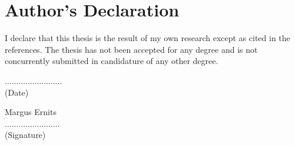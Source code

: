 \clearpage
\chapter*{Author’s Declaration}
\label{declaration}
\thispagestyle{empty}
I declare that this thesis is the result of my own research except as cited in the references. 
The thesis has not been accepted for any degree and is not concurrently submitted in candidature 
of any other degree.\\[2cm]

\begin{minipage}{0.5\textwidth}
	\begin{flushleft}
		......................... \\
		(Date) 
	\end{flushleft}
\end{minipage}
\begin{minipage}{0.5\textwidth}
	\begin{flushright}
	Margus Ernits \\
	........................ \\
	(Signature) 
	\end{flushright}
\end{minipage}

